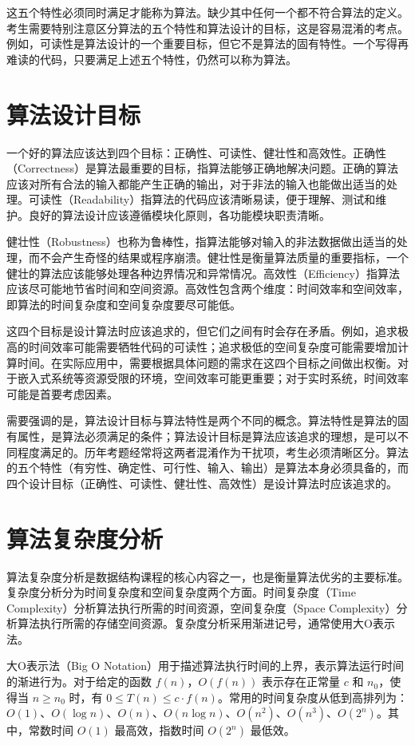 \documentclass[12pt, a4paper]{article}
\begin{document}
这五个特性必须同时满足才能称为算法。缺少其中任何一个都不符合算法的定义。考生需要特别注意区分算法的五个特性和算法设计的目标，这是容易混淆的考点。例如，可读性是算法设计的一个重要目标，但它不是算法的固有特性。一个写得再难读的代码，只要满足上述五个特性，仍然可以称为算法。

\section{算法设计目标}

一个好的算法应该达到四个目标：正确性、可读性、健壮性和高效性。正确性（Correctness）是算法最重要的目标，指算法能够正确地解决问题。正确的算法应该对所有合法的输入都能产生正确的输出，对于非法的输入也能做出适当的处理。可读性（Readability）指算法的代码应该清晰易读，便于理解、测试和维护。良好的算法设计应该遵循模块化原则，各功能模块职责清晰。

健壮性（Robustness）也称为鲁棒性，指算法能够对输入的非法数据做出适当的处理，而不会产生奇怪的结果或程序崩溃。健壮性是衡量算法质量的重要指标，一个健壮的算法应该能够处理各种边界情况和异常情况。高效性（Efficiency）指算法应该尽可能地节省时间和空间资源。高效性包含两个维度：时间效率和空间效率，即算法的时间复杂度和空间复杂度要尽可能低。

这四个目标是设计算法时应该追求的，但它们之间有时会存在矛盾。例如，追求极高的时间效率可能需要牺牲代码的可读性；追求极低的空间复杂度可能需要增加计算时间。在实际应用中，需要根据具体问题的需求在这四个目标之间做出权衡。对于嵌入式系统等资源受限的环境，空间效率可能更重要；对于实时系统，时间效率可能是首要考虑因素。

需要强调的是，算法设计目标与算法特性是两个不同的概念。算法特性是算法的固有属性，是算法必须满足的条件；算法设计目标是算法应该追求的理想，是可以不同程度满足的。历年考题经常将这两者混淆作为干扰项，考生必须清晰区分。算法的五个特性（有穷性、确定性、可行性、输入、输出）是算法本身必须具备的，而四个设计目标（正确性、可读性、健壮性、高效性）是设计算法时应该追求的。

\section{算法复杂度分析}

算法复杂度分析是数据结构课程的核心内容之一，也是衡量算法优劣的主要标准。复杂度分析分为时间复杂度和空间复杂度两个方面。时间复杂度（Time Complexity）分析算法执行所需的时间资源，空间复杂度（Space Complexity）分析算法执行所需的存储空间资源。复杂度分析采用渐进记号，通常使用大O表示法。

大O表示法（Big O Notation）用于描述算法执行时间的上界，表示算法运行时间的渐进行为。对于给定的函数 $f(n)$，$O(f(n))$ 表示存在正常量 $c$ 和 $n_0$，使得当 $n \ge n_0$ 时，有 $0 \le T(n) \le c \cdot f(n)$。常用的时间复杂度从低到高排列为：$O(1)$、$O(\log n)$、$O(n)$、$O(n \log n)$、$O(n^2)$、$O(n^3)$、$O(2^n)$。其中，常数时间 $O(1)$ 最高效，指数时间 $O(2^n)$ 最低效。
\end{document}
